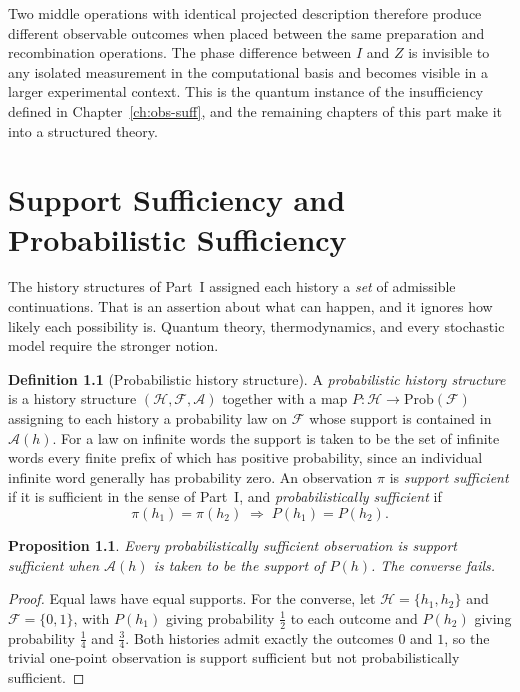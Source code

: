 \documentclass[11pt,oneside]{book}
\newtheorem{proposition}[theorem]{Proposition}
\theoremstyle{definition}
\newtheorem{definition}[theorem]{Definition}
\theoremstyle{remark}
\newcommand{\Hist}{\mathcal{H}}
\newcommand{\Fut}{\mathcal{F}}
\newcommand{\Adm}{\mathcal{A}}
\begin{document}
Two middle operations with identical projected description therefore produce different observable outcomes when placed between the same preparation and recombination operations. The phase difference between $I$ and $Z$ is invisible to any isolated measurement in the computational basis and becomes visible in a larger experimental context. This is the quantum instance of the insufficiency defined in Chapter~\ref{ch:obs-suff}, and the remaining chapters of this part make it into a structured theory.

\chapter{Support Sufficiency and Probabilistic Sufficiency}\label{ch:support}

The history structures of Part~I assigned each history a \emph{set} of admissible continuations. That is an assertion about what can happen, and it ignores how likely each possibility is. Quantum theory, thermodynamics, and every stochastic model require the stronger notion.

\begin{definition}[Probabilistic history structure]
A \emph{probabilistic history structure} is a history structure $(\Hist,\Fut,\Adm)$ together with a map $P\colon\Hist\to\mathrm{Prob}(\Fut)$ assigning to each history a probability law on $\Fut$ whose support is contained in $\Adm(h)$. For a law on infinite words the support is taken to be the set of infinite words every finite prefix of which has positive probability, since an individual infinite word generally has probability zero. An observation $\pi$ is \emph{support sufficient} if it is sufficient in the sense of Part~I, and \emph{probabilistically sufficient} if
\[
\pi(h_1)=\pi(h_2)\;\Longrightarrow\;P(h_1)=P(h_2).
\]
\end{definition}

\begin{proposition}\label{prop:support-prob}
Every probabilistically sufficient observation is support sufficient when $\Adm(h)$ is taken to be the support of $P(h)$. The converse fails.
\end{proposition}

\begin{proof}
Equal laws have equal supports. For the converse, let $\Hist=\{h_1,h_2\}$ and $\Fut=\{0,1\}$, with $P(h_1)$ giving probability $\tfrac12$ to each outcome and $P(h_2)$ giving probability $\tfrac14$ and $\tfrac34$. Both histories admit exactly the outcomes $0$ and $1$, so the trivial one-point observation is support sufficient but not probabilistically sufficient.
\end{proof}
\end{document}
